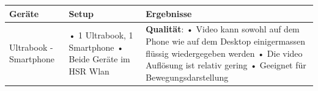 \begin{landscape}
			\noindent
			\begin{tabularx}{1.4\textwidth}{|lXX|}
				\hline
				\textbf{Geräte} & \textbf{Setup} & \textbf{Ergebnisse} \\
				\hline
					Ultrabook - Smartphone
				&
					• 1 Ultrabook, 1 Smartphone\newline
					• Beide Geräte im HSR Wlan
				& 
					\textbf{Qualität}:\newline
					• Video kann sowohl auf dem Phone wie auf dem Desktop einigermassen flüssig wiedergegeben werden\newline
					• Die video Auflösung ist relativ gering\newline
					• Geeignet für Bewegungsdarstellung\\
				\hline				
			\end{tabularx}\newline
			

\end{landscape}
